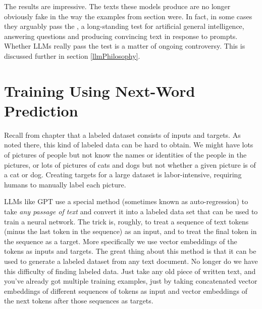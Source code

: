 The results are impressive. The texts these models produce are no longer obviously fake in the way the examples from section  were. In fact, in some cases they arguably pass the , a long-standing test for artificial general intelligence, answering questions and producing convincing  text in response to prompts. Whether LLMs really pass the test is a matter of ongoing controversy. This is discussed further in section \ref{llmPhilosophy}.

\section{Training Using Next-Word Prediction}

Recall from chapter  that a labeled dataset consists of inputs and targets. As noted there, this kind of labeled data can be hard to obtain. We might have lots of pictures of people but not know the names or identities of the people in the pictures, or lots of pictures of cats and dogs but not whether a given picture is of a cat or dog. Creating targets for a large dataset is labor-intensive, requiring humans to manually label each picture.

LLMs like GPT use a special method (sometimes known as auto-regression) to take \emph{any passage of text} and convert it into a labeled data set that can be used to train a neural network. The trick is, roughly, to treat a sequence of text tokens (minus the last token in the sequence) as an input, and to treat the final token in the sequence as a target. More specifically we use vector embeddings of the tokens as inputs and targets. The great thing about this method is that it can be used to generate a labeled dataset from any text document. No longer do we have this difficulty of finding labeled data. Just take any old piece of written text, and you've already got multiple training examples, just by taking concatenated vector embeddings of different sequences of tokens as input and vector embeddings of the next tokens after those sequences as targets.

